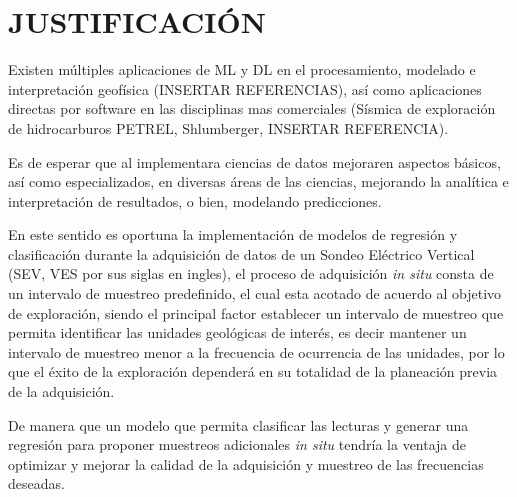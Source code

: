 \chapter{JUSTIFICACIÓN}
Existen múltiples aplicaciones de ML y DL en el procesamiento, modelado e interpretación geofísica (INSERTAR REFERENCIAS), así como aplicaciones directas por software en las disciplinas mas comerciales (Sísmica de exploración de hidrocarburos PETREL, Shlumberger,  INSERTAR REFERENCIA).

Es de esperar que al implementara ciencias de datos mejoraren aspectos básicos, así como especializados, en diversas áreas de las ciencias, mejorando la analítica e interpretación de resultados, o bien, modelando predicciones.

En este sentido es oportuna la implementación de modelos de regresión y clasificación durante la adquisición de datos de un Sondeo Eléctrico Vertical (SEV, VES por sus siglas en ingles), el proceso de adquisición \textit{in situ} consta de un intervalo de muestreo predefinido, el cual esta acotado de acuerdo al objetivo de exploración, siendo el principal factor establecer un intervalo de muestreo que permita identificar las unidades geológicas de interés, es decir mantener un intervalo de muestreo menor a la frecuencia de ocurrencia de las unidades, por lo que el éxito de la exploración dependerá en su totalidad de la planeación previa de la adquisición.

De manera que un modelo que permita clasificar las lecturas y generar una regresión para proponer muestreos adicionales \textit{in situ} tendría la ventaja de optimizar y mejorar la calidad de la adquisición y muestreo de las frecuencias deseadas.
